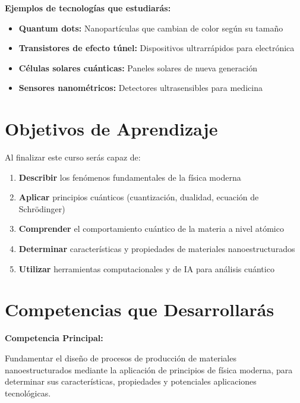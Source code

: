 \documentclass[12pt,a4paper]{book}
\begin{document}
	\begin{tecnologiabox}
		\textbf{Ejemplos de tecnologías que estudiarás:}
		\begin{itemize}
			\item \textbf{Quantum dots:} Nanopartículas que cambian de color según su tamaño
			\item \textbf{Transistores de efecto túnel:} Dispositivos ultrarrápidos para electrónica
			\item \textbf{Células solares cuánticas:} Paneles solares de nueva generación
			\item \textbf{Sensores nanométricos:} Detectores ultrasensibles para medicina
		\end{itemize}
	\end{tecnologiabox}
	
	\section{Objetivos de Aprendizaje}
	
		Al finalizar este curso serás capaz de:
		
		\begin{enumerate}
			\item \textbf{Describir} los fenómenos fundamentales de la física moderna
			\item \textbf{Aplicar} principios cuánticos (cuantización, dualidad, ecuación de Schrödinger)
			\item \textbf{Comprender} el comportamiento cuántico de la materia a nivel atómico
			\item \textbf{Determinar} características y propiedades de materiales nanoestructurados
			\item \textbf{Utilizar} herramientas computacionales y de IA para análisis cuántico
		\end{enumerate}
	
	\section{Competencias que Desarrollarás}
	
	\begin{competenciabox}
		\textbf{Competencia Principal:}
		
		Fundamentar el diseño de procesos de producción de materiales nanoestructurados mediante la aplicación de principios de física moderna, para determinar sus características, propiedades y potenciales aplicaciones tecnológicas.
	\end{competenciabox}
	
\end{document}
